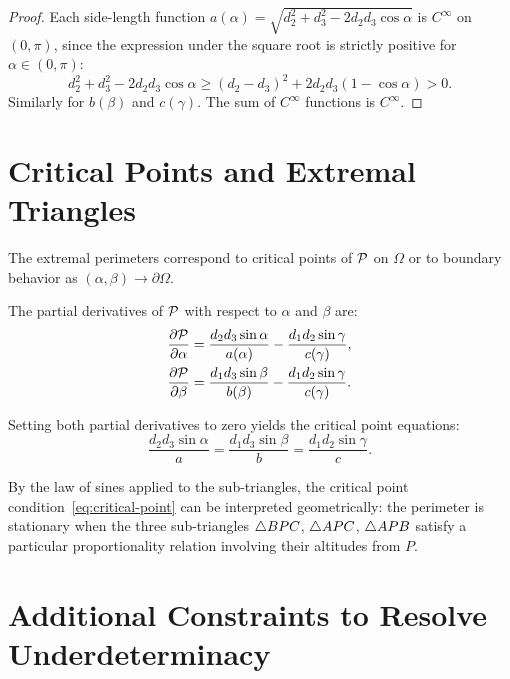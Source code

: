\begin{proof}
Each side-length function $a(\alpha) = \sqrt{d_2^2 + d_3^2 - 2d_2 d_3 \cos\alpha}$ is $C^\infty$ on $(0, \pi)$, since the expression under the square root is strictly positive for $\alpha \in (0, \pi)$:
\[
d_2^2 + d_3^2 - 2d_2 d_3 \cos\alpha \geq (d_2 - d_3)^2 + 2d_2 d_3 (1 - \cos\alpha) > 0.
\]
Similarly for $b(\beta)$ and $c(\gamma)$. The sum of $C^\infty$ functions is $C^\infty$.
\end{proof}

\section{Critical Points and Extremal Triangles}

The extremal perimeters correspond to critical points of $\mathcal{P}$ on $\Omega$ or to boundary behavior as $(\alpha, \beta) \to \partial\Omega$.

\begin{proposition}
The partial derivatives of $\mathcal{P}$ with respect to $\alpha$ and $\beta$ are:
\begin{align}
\frac{\partial \mathcal{P}}{\partial \alpha} &= \frac{d_2 d_3 \sin\alpha}{a(\alpha)} - \frac{d_1 d_2 \sin\gamma}{c(\gamma)}, \label{eq:dP-dalpha} \\
\frac{\partial \mathcal{P}}{\partial \beta} &= \frac{d_1 d_3 \sin\beta}{b(\beta)} - \frac{d_1 d_2 \sin\gamma}{c(\gamma)}. \label{eq:dP-dbeta}
\end{align}
\end{proposition}

Setting both partial derivatives to zero yields the critical point equations:
\begin{equation}
\label{eq:critical-point}
\frac{d_2 d_3 \sin\alpha}{a} = \frac{d_1 d_3 \sin\beta}{b} = \frac{d_1 d_2 \sin\gamma}{c}.
\end{equation}

\begin{remark}
By the law of sines applied to the sub-triangles, the critical point condition~\eqref{eq:critical-point} can be interpreted geometrically: the perimeter is stationary when the three sub-triangles $\triangle BPC$, $\triangle APC$, $\triangle APB$ satisfy a particular proportionality relation involving their altitudes from $P$.
\end{remark}

\section{Additional Constraints to Resolve Underdeterminacy}

